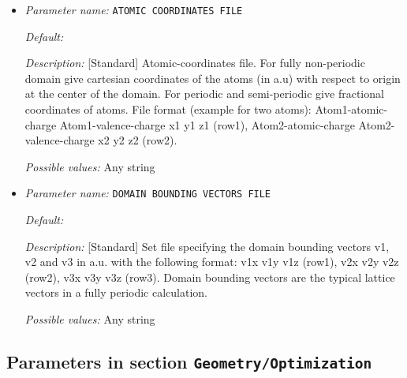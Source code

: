 \begin{itemize}
\item {\it Parameter name:} {\tt ATOMIC COORDINATES FILE}
\label{parameters:Geometry/ATOMIC COORDINATES FILE}
\label{parameters:Geometry/ATOMIC_20COORDINATES_20FILE}




{\it Default:} 


{\it Description:} [Standard] Atomic-coordinates file. For fully non-periodic domain give cartesian coordinates of the atoms (in a.u) with respect to origin at the center of the domain. For periodic and semi-periodic give fractional coordinates of atoms. File format (example for two atoms): Atom1-atomic-charge Atom1-valence-charge x1 y1 z1 (row1), Atom2-atomic-charge Atom2-valence-charge x2 y2 z2 (row2).


{\it Possible values:} Any string
\item {\it Parameter name:} {\tt DOMAIN BOUNDING VECTORS FILE}
\label{parameters:Geometry/DOMAIN BOUNDING VECTORS FILE}
\label{parameters:Geometry/DOMAIN_20BOUNDING_20VECTORS_20FILE}




{\it Default:} 


{\it Description:} [Standard] Set file specifying the domain bounding vectors v1, v2 and v3 in a.u. with the following format: v1x v1y v1z (row1), v2x v2y v2z (row2), v3x v3y v3z (row3). Domain bounding vectors are the typical lattice vectors in a fully periodic calculation.


{\it Possible values:} Any string
\end{itemize}



\subsection{Parameters in section \tt Geometry/Optimization}
\label{parameters:Geometry/Optimization}

